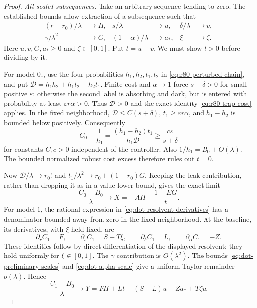\begin{proof}
\emph{All scaled subsequences.}
Take an arbitrary sequence tending to zero.  The established bounds
allow extraction of a subsequence such that
\begin{align*}
 (r-r_0)/\lambda&\longrightarrow H,&
 s/\lambda&\longrightarrow u,&
 \delta/\lambda&\longrightarrow v,\\
 \gamma/\lambda^2&\longrightarrow G,&
 (1-\alpha)/\lambda&\longrightarrow a_*,&
 \xi&\longrightarrow\zeta.
\end{align*}
Here $u,v,G,a_*\ge0$ and $\zeta\in[0,1]$.  Put $t=u+v$.
We must show $t>0$ before dividing by it.

For model $0_\varepsilon$, use the four probabilities
$h_1,h_2,t_1,t_2$ in \eqref{eq:r80-perturbed-chain}, and put
$\mathcal D=h_1h_2+h_1t_2+h_2t_1$.
Finite cost and $\alpha\to1$ force $s+\delta>0$ for small
positive $\varepsilon$: otherwise the second label is absorbing
and dark, but is entered with probability at least
$\varepsilon r\alpha>0$.  Thus $\mathcal D>0$ and the exact identity
\eqref{eq:r80-trap-cost} applies.  In the fixed neighborhood,
$\mathcal D\le C(s+\delta)$, $t_1\ge\varepsilon r\alpha$,
and $h_1-h_2$ is bounded below positively.  Consequently
\[
 C_0-\frac1{h_1}
 =\frac{(h_1-h_2)t_1}{h_1\mathcal D}
 \ge\frac{c\varepsilon}{s+\delta}
\]
for constants $C,c>0$ independent of the controller.
Also $1/h_1=B_0+O(\lambda)$.  The bounded normalized robust
cost excess therefore rules out $t=0$.

Now $\mathcal D/\lambda\to r_0t$ and
$t_1/\lambda^2\to r_0+(1-r_0)G$.  Keeping the leak contribution,
rather than dropping it as in a value lower bound, gives the exact
limit
\begin{equation}\label{eq:dot-model-zero-limit}
 \frac{C_0-B_0}{\lambda}\longrightarrow
 X=-AH+\frac{1+EG}{t}.
\end{equation}
For model $1$, the rational expression in
\eqref{eq:dot-resolvent-derivatives} has a denominator bounded
away from zero in the fixed neighborhood.  At the baseline,
its derivatives, with $\xi$ held fixed, are
\[
 \partial_r C_1=F,\qquad
 \partial_s C_1=S+T\xi,\qquad
 \partial_\delta C_1=L,\qquad
 \partial_\alpha C_1=-Z.
\]
These identities follow by direct differentiation of the displayed
resolvent; they hold uniformly for $\xi\in[0,1]$.
The $\gamma$ contribution is $O(\lambda^2)$.
The bounds \eqref{eq:dot-preliminary-scales} and
\eqref{eq:dot-alpha-scale} give a uniform Taylor remainder
$o(\lambda)$.  Hence
\begin{equation}\label{eq:dot-model-one-limit}
 \frac{C_1-B_0}{\lambda}\longrightarrow
 Y=FH+Lt+(S-L)u+Za_*+T\zeta u.
\end{equation}


\end{proof}
